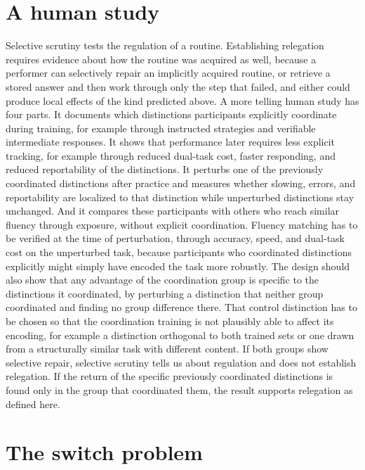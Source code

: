 \documentclass[11pt]{report}
\theoremstyle{remark}
\theoremstyle{definition}
\begin{document}
\section{A human study}\label{sec:humanstudy}

Selective scrutiny tests the regulation of a routine. Establishing relegation requires evidence about how the routine was acquired as well, because a performer can selectively repair an implicitly acquired routine, or retrieve a stored answer and then work through only the step that failed, and either could produce local effects of the kind predicted above. A more telling human study has four parts. It documents which distinctions participants explicitly coordinate during training, for example through instructed strategies and verifiable intermediate responses. It shows that performance later requires less explicit tracking, for example through reduced dual-task cost, faster responding, and reduced reportability of the distinctions. It perturbs one of the previously coordinated distinctions after practice and measures whether slowing, errors, and reportability are localized to that distinction while unperturbed distinctions stay unchanged. And it compares these participants with others who reach similar fluency through exposure, without explicit coordination. Fluency matching has to be verified at the time of perturbation, through accuracy, speed, and dual-task cost on the unperturbed task, because participants who coordinated distinctions explicitly might simply have encoded the task more robustly. The design should also show that any advantage of the coordination group is specific to the distinctions it coordinated, by perturbing a distinction that neither group coordinated and finding no group difference there. That control distinction has to be chosen so that the coordination training is not plausibly able to affect its encoding, for example a distinction orthogonal to both trained sets or one drawn from a structurally similar task with different content. If both groups show selective repair, selective scrutiny tells us about regulation and does not establish relegation. If the return of the specific previously coordinated distinctions is found only in the group that coordinated them, the result supports relegation as defined here.

\section{The switch problem}
\end{document}
